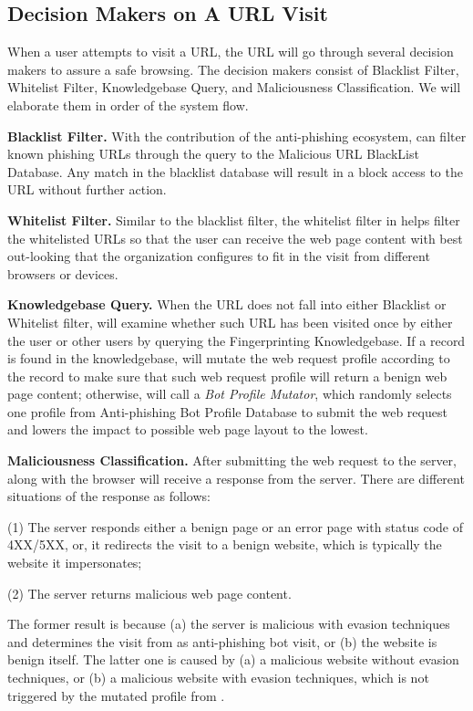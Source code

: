 \subsection{Decision Makers on A URL Visit}

When a user attempts to visit a URL, the URL will go through several decision makers to assure a safe browsing.
The decision makers consist of Blacklist Filter, Whitelist Filter, Knowledgebase Query, and Maliciousness Classification.
We will elaborate them in order of the system flow.

\noindent
\textbf{Blacklist Filter.}
With the contribution of the anti-phishing ecosystem, \spartacus can filter known phishing URLs through the query to the Malicious URL BlackList Database.
Any match in the blacklist database will result in a block access to the URL without further action.

\noindent
\textbf{Whitelist Filter.}
Similar to the blacklist filter, the whitelist filter in \spartacus helps filter the whitelisted URLs so that the user can receive the web page content with best out-looking that the organization configures to fit in the visit from different browsers or devices.

\noindent
\textbf{Knowledgebase Query.}
When the URL does not fall into either Blacklist or Whitelist filter, \spartacus will examine whether such URL has been visited once by either the user or other users by querying the Fingerprinting Knowledgebase.
If a record is found in the knowledgebase, \spartacus will mutate the web request profile according to the record to make sure that such web request profile will return a benign web page content;
otherwise, \spartacus will call a \emph{Bot Profile Mutator}, which randomly selects one profile from Anti-phishing Bot Profile Database to submit the web request and lowers the impact to possible web page layout to the lowest.

\noindent
\textbf{Maliciousness Classification.}
After submitting the web request to the server, \spartacus along with the browser will receive a response from the server.
There are different situations of the response as follows:

(1) The server responds either a benign page or an error page with status code of 4XX/5XX, or, it redirects the visit to a benign website, which is typically the website it impersonates;

(2) The server returns malicious web page content.

\noindent
The former result is because (a) the server is malicious with evasion techniques and determines the visit from \spartacus as anti-phishing bot visit, or (b) the website is benign itself.
The latter one is caused by (a) a malicious website without evasion techniques, or (b) a malicious website with evasion techniques, which is not triggered by the mutated profile from \spartacus.

